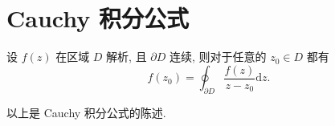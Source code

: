     \section{Cauchy 积分公式}
        \begin{theorem}
            设 $f\left(z\right)$ 在区域 $D$ 解析, 且 $\partial D$ 连续, 则对于任意的 $z_0\in D$ 都有
            $$
            f\left(z_0\right) = \oint_{\partial D}{\dfrac{f\left(z\right)}{z-z_0}\mathrm{d}z}.
            $$
        \end{theorem}
        以上是 Cauchy 积分公式的陈述.